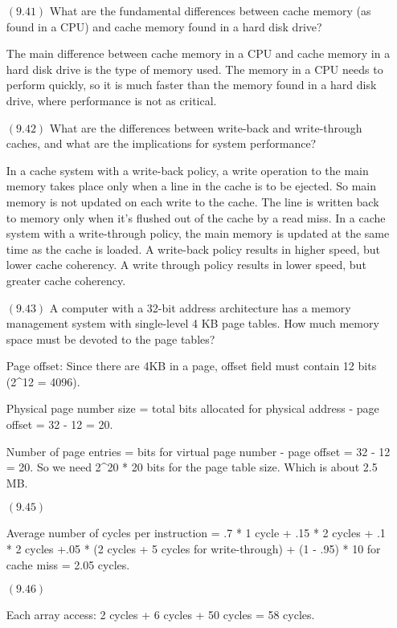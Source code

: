 \documentclass[letterpaper,10pt,titlepage]{article}
\begin{document}
\begin{enumerate}
\item[$(9.41)$] What are the fundamental differences between cache memory (as found in a CPU) and cache memory found in a hard disk drive? 

The main difference between cache memory in a CPU and cache memory in a hard disk drive is the type of memory used. The memory in a CPU needs to perform quickly, so it is much faster than the memory found in a hard disk drive, where performance is not as critical.


\item[$(9.42)$] What are the differences between write-back and write-through caches, and what are the implications for system performance? 

In a cache system with a write-back policy, a write operation to the main memory takes place only when a line in the cache is to be ejected. So main memory is not updated on each write to the cache. The line is written back to memory only when it’s flushed out of the cache by a read miss.
In a cache system with a write-through policy, the main memory is updated at the same time as the cache is loaded.
A write-back policy results in higher speed, but lower cache coherency. A write through policy results in lower speed, but greater cache coherency.


\item[$(9.43)$] A computer with a 32-bit address architecture has a memory management system with single-level 4 KB page tables. How much memory space must be devoted to the page tables?

Page offset: Since there are 4KB in a page, offset field must contain 12 bits (2^12 = 4096).

Physical page number size = total bits allocated for physical address - page offset = 32 - 12 = 20.

Number of page entries = bits for virtual page number - page offset = 32 - 12 = 20. So we need 2^20 * 20 bits for the page table size. Which is about 2.5 MB.

\item[$(9.45)$]
 
Average number of cycles per instruction = .7 * 1 cycle + .15 * 2 cycles + .1 * 2 cycles +.05 * (2 cycles + 5 cycles for write-through) + (1 - .95) * 10 for cache miss = 2.05 cycles.


\item[$(9.46)$]

Each array access: 2 cycles + 6 cycles + 50 cycles = 58 cycles.


\end{enumerate}
\end{document}
